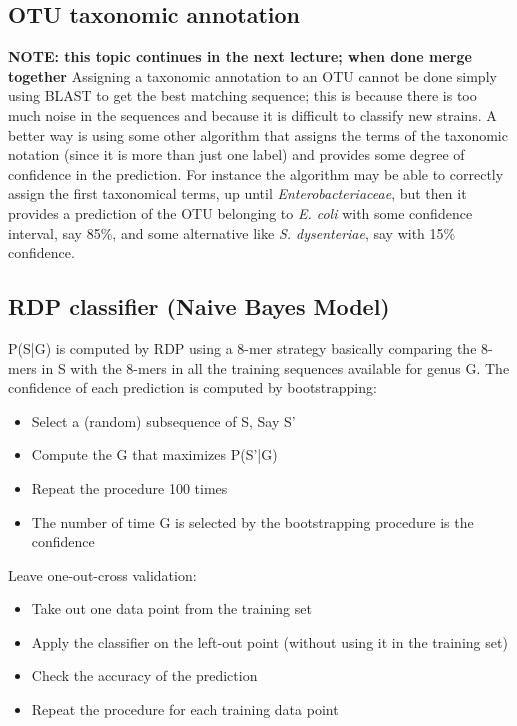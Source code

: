   \subsection{OTU taxonomic annotation}
    \textbf{NOTE: this topic continues in the next lecture; when done merge together}
    Assigning a taxonomic annotation to an OTU cannot be done simply using BLAST to get the best matching sequence; this is because there is too much noise in the sequences and because it is difficult to classify new strains. A better way is using some other algorithm that assigns the terms of the taxonomic notation (since it is more than just one label) and provides some degree of confidence in the prediction. For instance the algorithm may be able to correctly assign the first taxonomical terms, up until \textit{Enterobacteriaceae}, but then it provides a prediction of the OTU belonging to \textit{E. coli} with some confidence interval, say 85\%, and some alternative like \textit{S. dysenteriae}, say with 15\% confidence.

\subsection{RDP classifier (Naive Bayes Model)}

P(S|G) is computed by RDP using a 8-mer strategy basically comparing the 8-mers in S with the 8-mers in all the training sequences available for genus G. The confidence of each prediction is computed by bootstrapping: 

\begin{itemize}
    \item Select a (random) subsequence of S, Say S’ 
    \item Compute the G that maximizes P(S’|G) 
    \item Repeat the procedure 100 times 
    \item The number of time G is selected by the bootstrapping procedure is the confidence 
\end{itemize}

Leave one-out-cross validation: 

\begin{itemize}
    \item Take out one data point from the training set
    \item Apply the classifier on the left-out point (without using it in the training set)
    \item Check the accuracy of the prediction
    \item Repeat the procedure for each training data point
\end{itemize}

